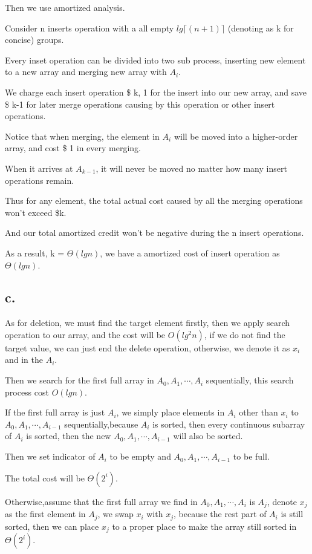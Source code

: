 \documentclass[oneside]{homework} %
\begin{document}
Then we use amortized analysis.

Consider n inserts operation with a all empty $lg\lceil (n+1) \rceil$ (denoting as k for concise) groups.

Every inset operation can be divided into two sub process, inserting new element to a new array and merging new array with $A_{i}$. 

We charge each insert operation \$ k, 1 for the insert into our new array, and save \$ k-1 for later merge operations causing by this operation or other insert operations. 

Notice that when merging, the element in $A_{i}$ will be moved into a higher-order array, and cost \$ 1 in every merging.   

When it arrives at $A_{k-1}$, it will never be moved no matter how many insert operations remain. 

Thus for any element, the total actual cost caused by all the merging operations won't exceed \$k.

And our total amortized credit won't be negative during the n insert operations. 

As a result, k = $\Theta(lgn)$, we have a amortized cost of insert operation as $\Theta(lgn)$.

\subsection* {c.}
As for deletion, we must find the target element firstly, then we apply search operation to our array, and the cost will be $O(lg^{2}n)$, if we do not find the target value, we can just end the delete operation, otherwise, we denote it as $x_{i}$ and in the $A_{i}$.

Then we search for the first full array in $A_{0},A_{1},\cdots,A_{i}$ sequentially, this search process cost $O(lgn)$. 

If the first full array is just $A_{i}$, we simply place elements in $A_{i}$ other than $x_{i}$ to $A_{0},A_{1},\cdots,A_{i-1}$ sequentially,because $A_{i}$ is sorted, then every continuous subarray of $A_{i}$ is sorted, then the new $A_{0},A_{1},\cdots,A_{i-1}$ will also be sorted.

Then we set indicator of $A_{i}$ to be empty and $A_{0},A_{1},\cdots,A_{i-1}$ to be full. 

The total cost will be $\Theta(2^{i})$.

Otherwise,assume that the first full array we find in $A_{0},A_{1},\cdots,A_{i}$ is $A_{j}$, denote $x_{j}$ as the first element in $A_{j}$, we swap $x_{i}$ with $x_{j}$, because the rest part of $A_{i}$ is still sorted, then we can place $x_{j}$ to a proper place to make the array still sorted in $\Theta(2^{i})$. 
\end{document}
